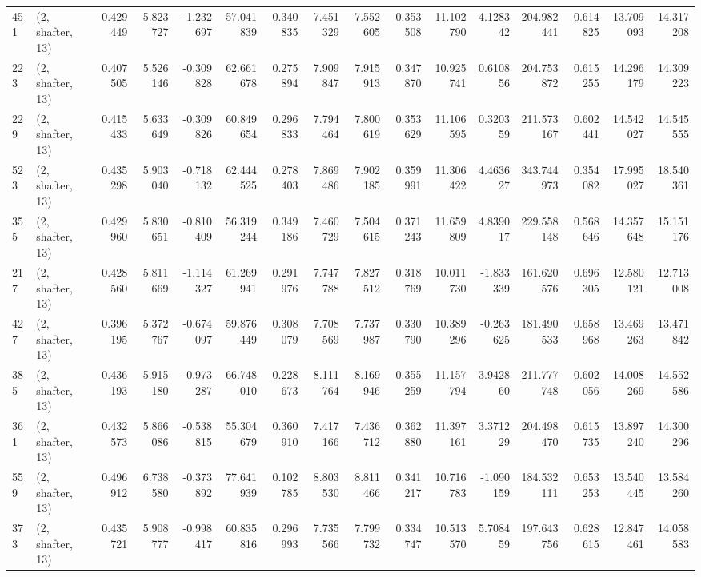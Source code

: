 \begin{tabular}{llrrrrrrrrrrrrrr}
451 &  (2, shafter, 13) &   0.429449 &   5.823727 &  -1.232697 &    57.041839 &   0.340835 &   7.451329 &   7.552605 &  0.353508 &  11.102790 &   4.128342 &   204.982441 &  0.614825 &  13.709093 &  14.317208 \\
223 &  (2, shafter, 13) &   0.407505 &   5.526146 &  -0.309828 &    62.661678 &   0.275894 &   7.909847 &   7.915913 &  0.347870 &  10.925741 &   0.610856 &   204.753872 &  0.615255 &  14.296179 &  14.309223 \\
229 &  (2, shafter, 13) &   0.415433 &   5.633649 &  -0.309826 &    60.849654 &   0.296833 &   7.794464 &   7.800619 &  0.353629 &  11.106595 &   0.320359 &   211.573167 &  0.602441 &  14.542027 &  14.545555 \\
523 &  (2, shafter, 13) &   0.435298 &   5.903040 &  -0.718132 &    62.444525 &   0.278403 &   7.869486 &   7.902185 &  0.359991 &  11.306422 &   4.463627 &   343.744973 &  0.354082 &  17.995027 &  18.540361 \\
355 &  (2, shafter, 13) &   0.429960 &   5.830651 &  -0.810409 &    56.319244 &   0.349186 &   7.460729 &   7.504615 &  0.371243 &  11.659809 &   4.839017 &   229.558148 &  0.568646 &  14.357648 &  15.151176 \\
217 &  (2, shafter, 13) &   0.428560 &   5.811669 &  -1.114327 &    61.269941 &   0.291976 &   7.747788 &   7.827512 &  0.318769 &  10.011730 &  -1.833339 &   161.620576 &  0.696305 &  12.580121 &  12.713008 \\
427 &  (2, shafter, 13) &   0.396195 &   5.372767 &  -0.674097 &    59.876449 &   0.308079 &   7.708569 &   7.737987 &  0.330790 &  10.389296 &  -0.263625 &   181.490533 &  0.658968 &  13.469263 &  13.471842 \\
385 &  (2, shafter, 13) &   0.436193 &   5.915180 &  -0.973287 &    66.748010 &   0.228673 &   8.111764 &   8.169946 &  0.355259 &  11.157794 &   3.942860 &   211.777748 &  0.602056 &  14.008269 &  14.552586 \\
361 &  (2, shafter, 13) &   0.432573 &   5.866086 &  -0.538815 &    55.304679 &   0.360910 &   7.417166 &   7.436712 &  0.362880 &  11.397161 &   3.371229 &   204.498470 &  0.615735 &  13.897240 &  14.300296 \\
559 &  (2, shafter, 13) &   0.496912 &   6.738580 &  -0.373892 &    77.641939 &   0.102785 &   8.803530 &   8.811466 &  0.341217 &  10.716783 &  -1.090159 &   184.532111 &  0.653253 &  13.540445 &  13.584260 \\
373 &  (2, shafter, 13) &   0.435721 &   5.908777 &  -0.998417 &    60.835816 &   0.296993 &   7.735566 &   7.799732 &  0.334747 &  10.513570 &   5.708459 &   197.643756 &  0.628615 &  12.847461 &  14.058583 \\

\end{tabular}
